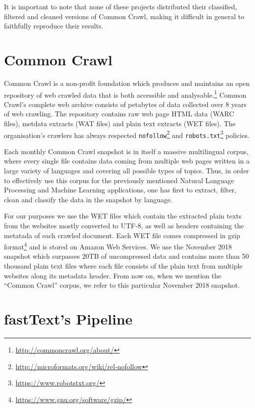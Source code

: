 It is important to note that none of these projects distributed their classified, filtered and cleaned versions of Common Crawl, making it difficult in general to faithfully reproduce their results.

\section{Common Crawl}

Common Crawl is a non-profit foundation which produces and maintains an open repository of web crawled data that is both accessible and analysable.\footnote{\url{http://commoncrawl.org/about/}} Common Crawl's complete web archive consists of petabytes of data collected over 8 years of web crawling. The repository contains raw web page HTML data (WARC files), metdata extracts (WAT files) and plain text extracts (WET files). The organisation's crawlers has always respected \texttt{nofollow}\footnote{\url{http://microformats.org/wiki/rel-nofollow}} and \texttt{robots.txt}\footnote{\url{https://www.robotstxt.org/}} policies.

Each monthly Common Crawl snapshot is in itself a massive multilingual corpus, where every single file contains data coming from multiple web pages written in a large variety of languages and covering all possible types of topics. Thus, in order to effectively use this corpus for the previously mentioned Natural Language Processing and Machine Learning applications, one has first to extract, filter, clean and classify the data in the snapshot by language.

For our purposes we use the WET files which contain the extracted plain texts from the websites mostly converted to UTF-8, as well as headers containing the metatada of each crawled document. Each WET file comes compressed in gzip format\footnote{\url{https://www.gnu.org/software/gzip/}} and is stored on Amazon Web Services. We use the November 2018 snapshot which surpasses 20TB of uncompressed data and contains more than 50 thousand plain text files where each file consists of the plain text from multiple websites along its metadata header. From now on, when we mention the ``Common Crawl'' corpus, we refer to this particular November 2018 snapshot.

\section{fastText's Pipeline}


